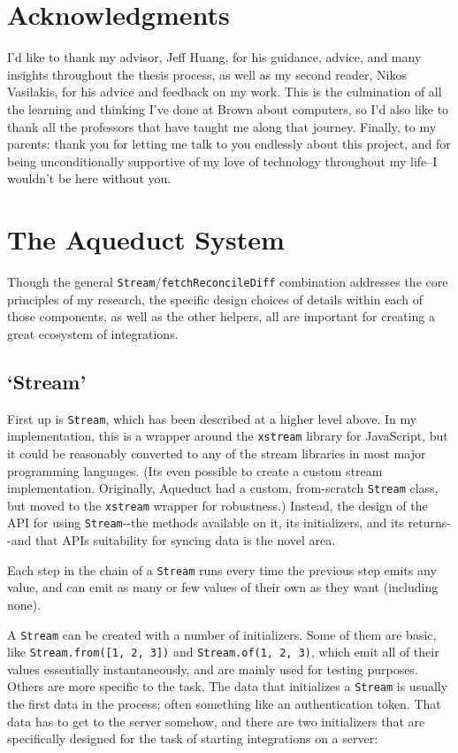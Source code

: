 \documentclass[manuscript,review,anonymous]{acmart}
\begin{document}
\section{Acknowledgments}
I'd like to thank my advisor, Jeff Huang, for his guidance, advice, and many insights throughout the thesis process, as well as my second reader, Nikos Vasilakis, for his advice and feedback on my work. This is the culmination of all the learning and thinking I've done at Brown about computers, so I'd also like to thank all the professors that have taught me along that journey. Finally, to my parents: thank you for letting me talk to you endlessly about this project, and for being unconditionally supportive of my love of technology throughout my life--I wouldn't be here without you.




\appendix
\section{The Aqueduct System}
Though the general \texttt{Stream}/\texttt{fetchReconcileDiff} combination addresses the core principles of my research, the specific design choices of details within each of those components, as well as the other helpers, all are important for creating a great ecosystem of integrations. 

\subsection{`Stream'}
First up is \texttt{Stream}, which has been described at a higher level
above. In my implementation, this is a wrapper around the
\texttt{xstream} library for JavaScript, but it could be reasonably
converted to any of the stream libraries in most major programming
languages. (It\textquotesingle s even possible to create a custom stream
implementation. Originally, Aqueduct had a custom, from-scratch
\texttt{Stream} class, but moved to the \texttt{xstream} wrapper for
robustness.) Instead, the design of the API for using
\texttt{Stream}-\/-the methods available on it, its initializers, and
its returns-\/-and that API\textquotesingle s suitability for syncing
data is the novel area.

Each step in the chain of a \texttt{Stream} runs every time the previous
step emits any value, and can emit as many or few values of their own as
they want (including none).

A \texttt{Stream} can be created with a number of initializers. Some of
them are basic, like \texttt{Stream.from({[}1,\ 2,\ 3{]})} and
\texttt{Stream.of(1,\ 2,\ 3)}, which emit all of their values
essentially instantaneously, and are mainly used for testing purposes.
Others are more specific to the task. The data that initializes a
\texttt{Stream} is usually the first data in the process; often
something like an authentication token. That data has to get to the
server somehow, and there are two initializers that are specifically
designed for the task of starting integrations on a server:
\end{document}
